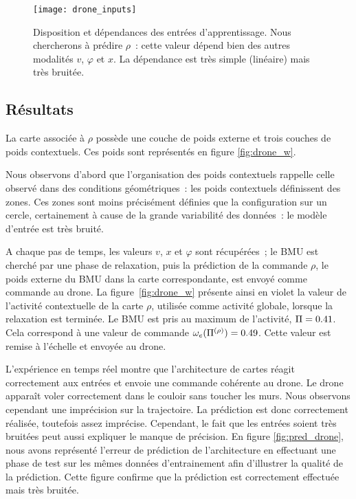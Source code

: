 \documentclass[../main]{subfiles}
\begin{document}
\begin{figure}
	\centering\texttt{[image: drone\_inputs]}
	\caption{Disposition et dépendances des entrées d'apprentissage. Nous chercherons à prédire $\rho$~: cette valeur dépend bien des autres modalités $v$, $\varphi$ et $x$. La dépendance est très simple (linéaire) mais très bruitée. \label{fig:drone_inp}}
\end{figure}


\subsection{Résultats}

La carte associée à $\rho$ possède une couche de poids externe et trois couches de poids contextuels. 
Ces poids sont représentés en figure \ref{fig:drone_w}. 

Nous observons d'abord que l'organisation des poids contextuels rappelle celle observé dans des conditions géométriques~: les poids contextuels définissent des zones. 
Ces zones sont moins précisément définies que la configuration sur un cercle, certainement à cause de la grande variabilité des données~: le modèle d'entrée est très bruité.

A chaque pas de temps, les valeurs $v$, $x$ et $\varphi$ sont récupérées~; le BMU est cherché par une phase de relaxation, puis la prédiction de la commande $\rho$, le poids externe du BMU dans la carte correspondante, est envoyé comme commande au drone.
La figure~\ref{fig:drone_w} présente ainsi en violet la valeur de l'activité contextuelle de la carte $\rho$, utilisée comme activité globale, lorsque la relaxation est terminée. Le BMU est pris au maximum de l'activité, $\Pi = 0.41$. Cela correspond à une valeur de commande $\omega_e(\Pi^{({\rho})}) = 0.49$. Cette valeur est remise à l'échelle et envoyée au drone.

L'expérience en temps réel montre que l'architecture de cartes réagit correctement aux entrées et envoie une commande cohérente au drone. Le drone apparaît voler correctement dans le couloir sans toucher les murs. Nous observons cependant une imprécision sur la trajectoire. La prédiction est donc correctement réalisée, toutefois assez imprécise. Cependant, le fait que les entrées soient très bruitées peut aussi expliquer le manque de précision. 
En figure \ref{fig:pred_drone}, nous avons représenté l'erreur de prédiction de l'architecture en effectuant une phase de test sur les mêmes données d'entrainement afin d'illustrer la qualité de la prédiction. Cette figure confirme que la prédiction est correctement effectuée mais très bruitée.
\end{document}

